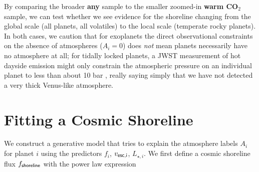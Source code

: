 \documentclass[modern,linenumbers,trackchanges]{aastex7}
\begin{document}
By comparing the broader {\bf any} sample to the smaller zoomed-in {\bf warm CO$_2$} sample, we can test whether we see evidence for the shoreline changing from the global scale (all planets, all volatiles) to the local scale (temperate rocky planets). In both cases, we caution that for exoplanets the direct observational constraints on the absence of atmospheres ($A_i = 0$) does {\em not} mean planets necessarily have no atmosphere at all; for tidally locked planets, a JWST measurement of hot dayside emission might only constrain the atmospheric pressure on an individual planet to less than about 10 bar \citep{kollScalingAtmosphericHeat2022}, really saying simply that we have not detected a very thick Venus-like atmosphere.



\section{Fitting a Cosmic Shoreline}
\label{s:fitting} 

We construct a generative model that tries to explain the atmosphere labels $A_i$ for planet $i$ using the predictors $f_i$, $v_{\sf esc, i}$, $L_{\star, i}$. We first define a cosmic shoreline flux $f_{\sf shoreline}$ with the power law expression
\end{document}
